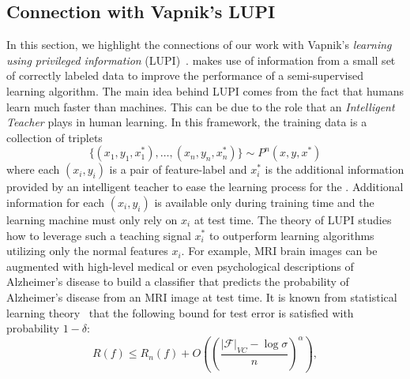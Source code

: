 \subsection{Connection with Vapnik's LUPI}
\label{sec:LUPI}
In this section, we highlight the connections of our work with Vapnik's \emph{learning using privileged information} (LUPI)~\citep{vapnik2009new, vapnik2015learning}. \fwl makes use of information from a small set of correctly labeled data to improve the performance of a semi-supervised learning algorithm. The main idea behind LUPI comes from the fact that humans learn much faster than machines. This can be due to the role that an \emph{Intelligent Teacher} plays in human learning. In this framework, the training data is a collection of triplets
\begin{equation}
    \{(x_1, y_1, x_1^*),\ldots,(x_n,y_n,x_n^*)\}\mathtt{\sim}P^n(x,y,x^*)
\end{equation}
where each ${(x_i,y_i)}$ is a pair of feature-label and $x_i^*$ is the additional information provided by an intelligent teacher to ease the learning process for the \std. Additional information for each ${(x_i,y_i)}$ is available only during training time and the learning machine must only rely on $x_i$ at test time. The theory of LUPI studies how to leverage such a teaching signal $x_i^*$ to outperform learning algorithms utilizing only the normal features $x_i$. For example, MRI brain images can be augmented with high-level medical or even psychological descriptions of Alzheimer's disease to build a classifier that predicts the probability of Alzheimer's disease from an MRI image at test time.
It is known from statistical learning theory~\citep{Vapnik1998} that the following bound for test error is satisfied with probability $1-\delta$:
\begin{equation}
\label{eq:LUPI_error_bound}
    R(f) \leq R_n(f) + O\left(\left(\frac{|\mathcal{F}|_{VC}-\log \sigma}{n}\right)^\alpha\right),
\end{equation}

